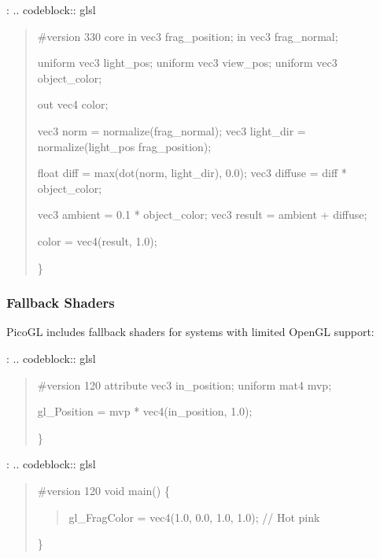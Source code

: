 \documentclass[a4paper,10pt,english,openany,oneside]{sphinxmanual}
\begin{document}
\sphinxAtStartPar
{}:
.. code\sphinxhyphen{}block:: glsl
\begin{quote}

\sphinxAtStartPar
\#version 330 core
in vec3 frag\_position;
in vec3 frag\_normal;

\sphinxAtStartPar
uniform vec3 light\_pos;
uniform vec3 view\_pos;
uniform vec3 object\_color;

\sphinxAtStartPar
out vec4 color;
\begin{description}
\sphinxAtStartPar
vec3 norm = normalize(frag\_normal);
vec3 light\_dir = normalize(light\_pos \sphinxhyphen{} frag\_position);

\sphinxAtStartPar
float diff = max(dot(norm, light\_dir), 0.0);
vec3 diffuse = diff * object\_color;

\sphinxAtStartPar
vec3 ambient = 0.1 * object\_color;
vec3 result = ambient + diffuse;

\sphinxAtStartPar
color = vec4(result, 1.0);

\end{description}

\sphinxAtStartPar
\}
\end{quote}


\subsubsection{Fallback Shaders}
\label{\detokenize{api/shaders:fallback-shaders}}
\sphinxAtStartPar
PicoGL includes fallback shaders for systems with limited OpenGL support:

\sphinxAtStartPar
{}:
.. code\sphinxhyphen{}block:: glsl
\begin{quote}

\sphinxAtStartPar
\#version 120
attribute vec3 in\_position;
uniform mat4 mvp;
\begin{description}
\sphinxAtStartPar
gl\_Position = mvp * vec4(in\_position, 1.0);

\end{description}

\sphinxAtStartPar
\}
\end{quote}

\sphinxAtStartPar
{}:
.. code\sphinxhyphen{}block:: glsl
\begin{quote}

\sphinxAtStartPar
\#version 120
void main() \{
\begin{quote}

\sphinxAtStartPar
gl\_FragColor = vec4(1.0, 0.0, 1.0, 1.0);  // Hot pink
\end{quote}

\sphinxAtStartPar
\}
\end{quote}
\end{document}
